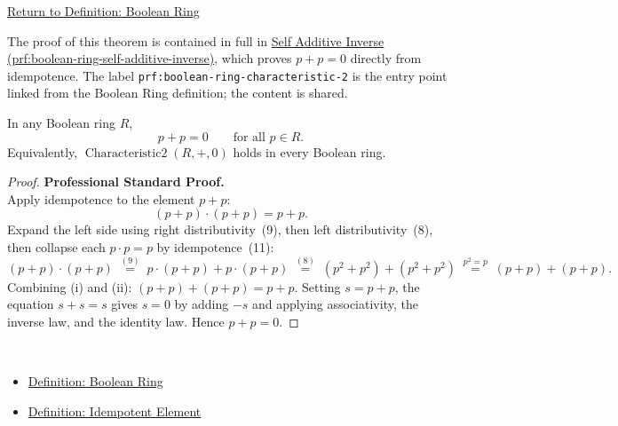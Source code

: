 \newpage
{}
\label{prf:boolean-ring-characteristic-2}

\begin{remark*}[Return]
\hyperref[def:boolean-ring]{Return to Definition: Boolean Ring}
\end{remark*}

\begin{remark*}
The proof of this theorem is contained in full in
\hyperref[prf:boolean-ring-self-additive-inverse]{Self Additive Inverse
(prf:boolean-ring-self-additive-inverse)}, which proves $p + p = 0$ directly
from idempotence. The label \texttt{prf:boolean-ring-characteristic-2} is the
entry point linked from the Boolean Ring definition; the content is shared.
\end{remark*}

\begin{theorem*}
In any Boolean ring $R$,
\[
p + p = 0 \qquad \text{for all } p \in R.
\]
Equivalently, $\operatorname{Characteristic2}(R,+,0)$ holds in every
Boolean ring.
\end{theorem*}

\begin{proof}
\textbf{Professional Standard Proof.}~\\
Apply idempotence to the element $p + p$:
\[
(p + p) \cdot (p + p) = p + p. \tag{i}
\]
Expand the left side using right distributivity~(9), then left
distributivity~(8), then collapse each $p \cdot p = p$ by
idempotence~(11):
\[
(p + p) \cdot (p + p)
  \;\overset{(9)}{=}\; p\cdot(p+p) + p\cdot(p+p)
  \;\overset{(8)}{=}\; (p^2 + p^2) + (p^2 + p^2)
  \;\overset{p^2=p}{=}\; (p + p) + (p + p). \tag{ii}
\]
Combining (i) and (ii): $(p+p) + (p+p) = p+p$.
Setting $s = p+p$, the equation $s + s = s$ gives $s = 0$
by adding $-s$ and applying associativity, the inverse law,
and the identity law.
Hence $p + p = 0$.
\end{proof}

\begin{remark*}[Dependencies]~\\
\begin{itemize}
  \item \hyperref[def:boolean-ring]{Definition: Boolean Ring}
  \item \hyperref[def:idempotent-element]{Definition: Idempotent Element}
\end{itemize}
\end{remark*}
